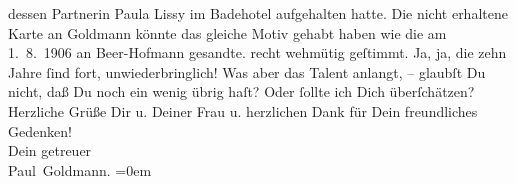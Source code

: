 \begin{ledgroupsized}[t]{13cm}
{{{                  dessen Partnerin Paula Lissy im Badehotel aufgehalten hatte. Die nicht
                  erhaltene Karte an Goldmann könnte das
                  gleiche Motiv gehabt haben wie die am 1. 8. 1906 an Beer-Hofmann
                  gesandte.}}}\label{K_L03249-1h} recht wehmütig geſtimmt. Ja, ja, die zehn Jahre ſind fort, unwiederbringlich!
               Was aber das Talent anlangt, – glaubſt Du nicht, daß Du noch ein wenig übrig haſt?
               Oder ſollte ich Dich überſchätzen?\pend
           \pstart
           Herzliche Grüße Dir u. Deiner Frau u. herzlichen Dank für Dein freundliches Gedenken! {\\[\baselineskip]}Dein getreuer {\\[\baselineskip]}\spacefill\mbox{Paul Goldmann.}\pend
           \leftskip=0em{}
         
         \endnumbering{}\end{ledgroupsized}  \newcommand{\dateiname}{L03249}\newcommand{\titel}{Paul Goldmann an Arthur Schnitzler, 3. 8. 1906}\newcommand{\editorInnen}{Martin Anton Müller und Laura Untner}
      
